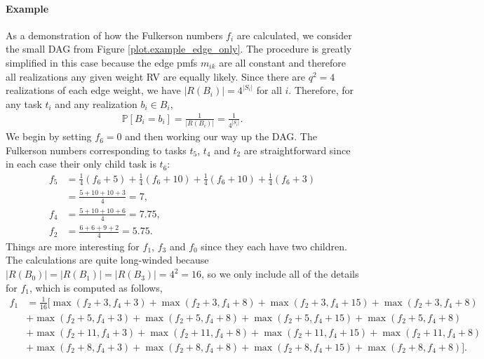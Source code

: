 \documentclass[12pt]{article}
\def\P{\mathbb{P}}
\begin{document}
\paragraph{Example}
\label{para.fulkerson_example}

As a demonstration of how the Fulkerson numbers $f_i$ are calculated, we consider the small DAG from Figure \ref{plot.example_edge_only}. The procedure is greatly simplified in this case because the edge pmfs $m_{ik}$ are all constant and therefore all realizations any given weight RV are equally likely. Since there are $q^2 = 4$ realizations of each edge weight, we have $|R(B_i)| = 4^{|S_i|}$ for all $i$. Therefore, for any task $t_i$ and any realization $b_i \in B_i$,  
\begin{align*}
\P[B_i = b_i] = \frac{1}{|R(B_i)|} = \frac{1}{4^{|S_i|}}. 
\end{align*}   
We begin by setting $f_6 = 0$ and then working our way up the DAG. The Fulkerson numbers corresponding to tasks $t_5$, $t_4$ and $t_2$ are straightforward since in each case their only child task is $t_6$:
\begin{align*}
f_5 &= \frac{1}{4}(f_6 + 5) + \frac{1}{4}(f_6 + 10) + \frac{1}{4}(f_6 + 10) + \frac{1}{4}(f_6 + 3) \\
&= \frac{5 + 10 + 10 + 3}{4} = 7, \\
f_4 &= \frac{5 + 10 + 10 + 6}{4} = 7.75, \\
f_2 &= \frac{6 + 6 + 9 + 2}{4} = 5.75.
\end{align*}    
Things are more interesting for $f_1$, $f_3$ and $f_0$ since they each have two children. The calculations are quite long-winded because $|R(B_0)| = |R(B_1)| = |R(B_3)| = 4^2 = 16$, so we only include all of the details for $f_1$, which is computed as follows, 
{\footnotesize
\begin{align*} 
f_1 &= \frac{1}{16} [ \max(f_2 + 3, f_4 + 3) + \max(f_2 + 3, f_4 + 8) + \max(f_2 + 3, f_4 + 15) + \max(f_2 + 3, f_4 + 8)  \\
&+ \max(f_2 + 5, f_4 + 3) + \max(f_2 + 5, f_4 + 8) + \max(f_2 + 5, f_4 + 15) + \max(f_2 + 5, f_4 + 8) \\
&+ \max(f_2 + 11, f_4 + 3) + \max(f_2 + 11, f_4 + 8) + \max(f_2 + 11, f_4 + 15) + \max(f_2 + 11, f_4 + 8) \\
&+ \max(f_2 + 8, f_4 + 3) + \max(f_2 + 8, f_4 + 8) + \max(f_2 + 8, f_4 + 15) + \max(f_2 + 8, f_4 + 8) ].
\end{align*} 
}%
\end{document}
